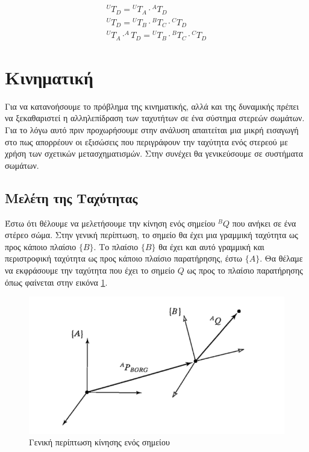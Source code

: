 \begin{equation}
    \begin{aligned}
        ^UT_D = {}^UT_A \cdot {}^AT_D\\[10pt]
        ^UT_D = {}^UT_B \cdot {}^BT_C \cdot {}^CT_D\\[10pt]
        ^UT_A \cdot ^AT_D = {}^UT_B \cdot {}^BT_C \cdot {}^CT_D
    \end{aligned}
    \label{equ:chain}
\end{equation}

\section{Κινηματική}

Για να κατανοήσουμε το πρόβλημα της κινηματικής, αλλά και της δυναμικής πρέπει να ξεκαθαριστεί η αλληλεπίδραση των ταχυτήτων σε ένα σύστημα στερεών σωμάτων. Για το λόγω αυτό πριν προχωρήσουμε στην ανάλυση απαιτείται μια μικρή εισαγωγή στο πως απορρέουν οι εξισώσεις που περιγράφουν την ταχύτητα ενός στερεού με χρήση των σχετικών μετασχηματισμών. Στην συνέχει θα γενικεύσουμε σε συστήματα σωμάτων.

\subsection{Μελέτη της Ταχύτητας}

Έστω ότι θέλουμε να μελετήσουμε την κίνηση ενός σημείου $^BQ$ που ανήκει σε ένα στέρεο σώμα. Στην γενική περίπτωση, το σημείο θα έχει μια γραμμική ταχύτητα ως προς κάποιο πλαίσιο $\{Β\}$. Το πλαίσιο $\{Β\}$ θα έχει και αυτό γραμμική και περιστροφική ταχύτητα ως προς κάποιο πλαίσιο παρατήρησης, έστω $\{Α\}$. Θα θέλαμε να εκφράσουμε την ταχύτητα που έχει το σημείο $Q$ ως προς το πλαίσιο παρατήρησης όπως φαίνεται στην εικόνα \ref{fig:velocity}.

\begin{figure}[H]
    \centering
    \includegraphics[width=.8\textwidth]{rigidbody/fig/velocity.png}
    \caption{Γενική περίπτωση κίνησης ενός σημείου\cite{craig95}}
    \label{fig:velocity}
\end{figure}

